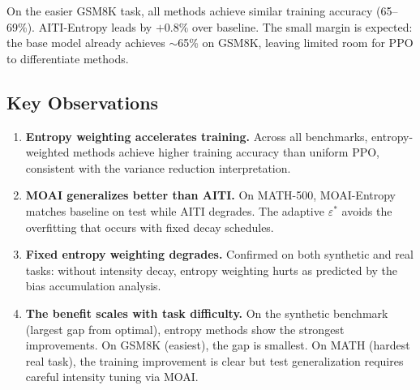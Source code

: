 \documentclass[11pt,a4paper]{article}
\begin{document}
On the easier GSM8K task, all methods achieve similar training accuracy (65--69\%). AITI-Entropy leads by $+0.8\%$ over baseline. The small margin is expected: the base model already achieves $\sim$65\% on GSM8K, leaving limited room for PPO to differentiate methods.

\subsection{Key Observations}

\begin{enumerate}
    \item \textbf{Entropy weighting accelerates training.} Across all benchmarks, entropy-weighted methods achieve higher training accuracy than uniform PPO, consistent with the variance reduction interpretation.

    \item \textbf{MOAI generalizes better than AITI.} On MATH-500, MOAI-Entropy matches baseline on test while AITI degrades. The adaptive $\varepsilon^*$ avoids the overfitting that occurs with fixed decay schedules.

    \item \textbf{Fixed entropy weighting degrades.} Confirmed on both synthetic and real tasks: without intensity decay, entropy weighting hurts as predicted by the bias accumulation analysis.

    \item \textbf{The benefit scales with task difficulty.} On the synthetic benchmark (largest gap from optimal), entropy methods show the strongest improvements. On GSM8K (easiest), the gap is smallest. On MATH (hardest real task), the training improvement is clear but test generalization requires careful intensity tuning via MOAI.
\end{enumerate}



\end{document}
